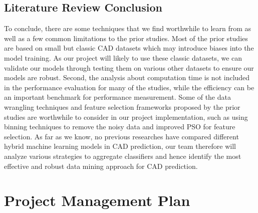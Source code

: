 \documentclass[a4paper, 12pt]{article}
\begin{document}
    \subsection{Literature Review Conclusion}
    To conclude, there are some techniques that we find worthwhile to learn from as well as a few common limitations to the prior studies. Most of the prior studies are based on small but classic CAD datasets which may introduce biases into the model training. As our project will likely to use these classic datasets, we can validate our models through testing them on various other datasets to ensure our models are robust. Second, the analysis about computation time is not included in the performance evaluation for many of the studies, while the efficiency can be an important benchmark for performance measurement. Some of the data wrangling techniques and feature selection frameworks proposed by the prior studies are worthwhile to consider in our project implementation, such as using binning techniques to remove the noisy data and improved PSO for feature selection. As far as we know, no previous researches have compared different hybrid machine learning models in CAD prediction, our team therefore will analyze various strategies to aggregate classifiers and hence identify the most effective and robust data mining approach for CAD prediction.
\pagebreak    
\section{Project Management Plan}
\end{document}
